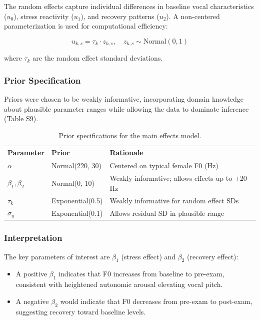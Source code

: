 \documentclass[
  english,
  man,floatsintext]{apa6}
\providecommand{\tightlist}{%
  \setlength{\itemsep}{0pt}\setlength{\parskip}{0pt}}
\begin{document}
The random effects capture individual differences in baseline vocal characteristics (\(u_0\)), stress reactivity (\(u_1\)), and recovery patterns (\(u_2\)). A non-centered parameterization is used for computational efficiency:

\[
u_{k,s} = \tau_k \cdot z_{k,s}, \quad z_{k,s} \sim \text{Normal}(0, 1)
\]

where \(\tau_k\) are the random effect standard deviations.

\subsubsection{Prior Specification}\label{prior-specification}

Priors were chosen to be weakly informative, incorporating domain knowledge about plausible parameter ranges while allowing the data to dominate inference (Table S9).

\begin{table}

\caption{\label{tab:table-s8-priors-main}Prior specifications for the main effects model.}
\centering
\begin{tabular}[t]{lll}
\toprule
Parameter & Prior & Rationale\\
\midrule
$\alpha$ & Normal(220, 30) & Centered on typical female F0 (Hz)\\
$\beta_1, \beta_2$ & Normal(0, 10) & Weakly informative; allows effects up to $\pm$20 Hz\\
$\tau_k$ & Exponential(0.5) & Weakly informative for random effect SDs\\
$\sigma_y$ & Exponential(0.1) & Allows residual SD in plausible range\\
\bottomrule
\end{tabular}
\end{table}

\subsubsection{Interpretation}\label{interpretation}

The key parameters of interest are \(\beta_1\) (stress effect) and \(\beta_2\) (recovery effect):

\begin{itemize}
\tightlist
\item
  A positive \(\beta_1\) indicates that F0 increases from baseline to pre-exam, consistent with heightened autonomic arousal elevating vocal pitch.
\item
  A negative \(\beta_2\) would indicate that F0 decreases from pre-exam to post-exam, suggesting recovery toward baseline levels.
\end{itemize}
\end{document}
